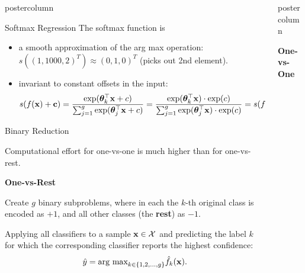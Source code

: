 \documentclass{beamer}
\newlength{\columnheight} %
\begin{document}
\begin{frame}[fragile]{}
\begin{columns}
\begin{column}{.31\textwidth}
\begin{beamercolorbox}[center]{postercolumn}
\begin{minipage}{.98\textwidth}
{\begin{myblock}{Softmax Regression}
  The softmax function is 
  \begin{itemize}[$\bullet$] 
  \setlength{\itemindent}{+.3in}
  \item a smooth approximation of the arg max operation: \\
  $s((1, 1000, 2)^T) \approx (0, 1, 0)^T$ (picks out 2nd element).  
  \item invariant to constant offsets in the input:  
    $$ 
    s(f(\mathbf{x}) + \mathbf{c}) = \frac{\exp(\bm{\theta}_k^\top \mathbf{x} + c)}{\sum_{j = 1}^g \exp(\bm{\theta}_j^\top \mathbf{x} + c)} = 
    \frac{\exp(\bm{\theta}_k^\top \mathbf{x})\cdot \exp(c)}{\sum_{j = 1}^g \exp(\bm{\theta}_j^\top \mathbf{x}) \cdot \exp(c)} = 
    s(f(\mathbf{x}))
    $$  
\end{itemize}
  \end{myblock}


  \begin{myblock}{Binary Reduction}

    Computational effort for one-vs-one is much higher than for one-vs-rest.
  \begin{codebox} 
  \textbf{One-vs-Rest}
  \end{codebox}

Create $g$ binary subproblems, where in each the $k$-th original class is encoded as $+1$, and all other classes (the \textbf{rest}) as $- 1$.

Applying all classifiers to a sample $\mathbf{x} \in \mathcal{X}$ and predicting the label $k$ for which the corresponding classifier reports the highest confidence: 
    $$
      \hat y = \text{arg max}_{k \in \{1, 2, ..., g\}} \hat f_k(\mathbf{x}). 
    $$
  
\end{myblock}
}
\end{minipage}
\end{beamercolorbox}
\end{column}


\begin{column}{.31\textwidth}
\begin{beamercolorbox}[center]{postercolumn}
\begin{minipage}{.98\textwidth}
\parbox[t][\columnheight]{\textwidth}{

  \begin{myblock}{}
  
    \begin{codebox} 
  \textbf{One-vs-One}
  \end{codebox}


\end{myblock}}
\end{minipage}
\end{beamercolorbox}
\end{column}
\end{columns}
\end{frame}
\end{document}

